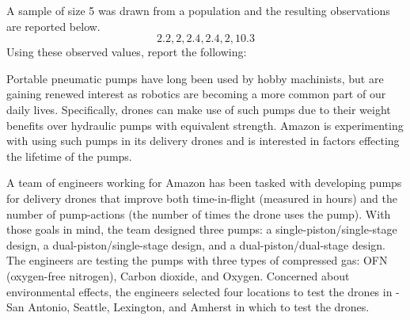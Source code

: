 \documentclass[addpoints]{examsetup}\usepackage[]{graphicx}\usepackage[]{color}
\begin{document}
\begin{questions}
\begin{parts}
   \vspace{1cm}

\end{parts}

\vspace{1cm}

\question 

A sample of size 5 was drawn from a population and the resulting observations are reported below. 
$$
   2.2, 2, 2.4, 2.4, 2, 10.3
$$
Using these observed values, report the following:

\vspace{0.5cm}


\newpage

\question
Portable pneumatic pumps have long been used by hobby machinists, but are gaining renewed interest as robotics are becoming a more common part of our daily lives.
Specifically, drones can make use of such pumps due to their weight benefits over hydraulic pumps with equivalent strength.
Amazon is experimenting with using such pumps in its delivery drones and is interested in factors effecting the lifetime of the pumps.

A team of engineers working for Amazon has been tasked with developing pumps for delivery drones that improve both time-in-flight (measured in hours) and the number of pump-actions (the number of times the drone uses the pump).
With those goals in mind, the team designed three pumps: a single-piston/single-stage design, a dual-piston/single-stage design, and a dual-piston/dual-stage design.
The engineers are testing the pumps with three types of compressed gas: OFN (oxygen-free nitrogen), Carbon dioxide, and Oxygen.
Concerned about environmental effects, the engineers selected four locations to test the drones in - San Antonio, Seattle, Lexington, and Amherst in which to test the drones.


\end{questions}
\end{document}

